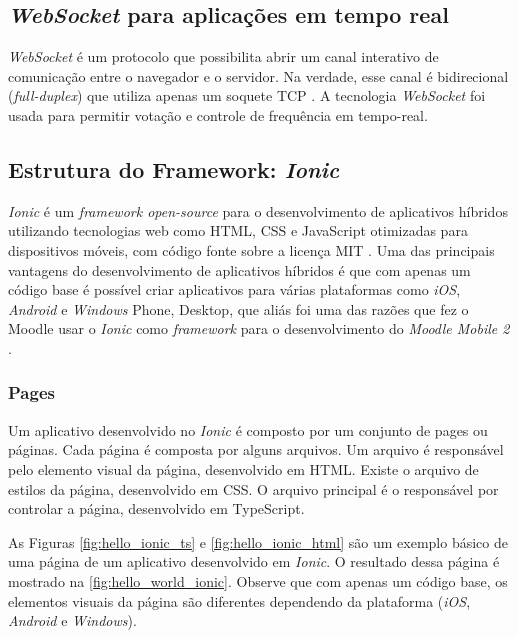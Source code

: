 \subsection{\textit{WebSocket} para aplicações em tempo real}

\textit{WebSocket} é um protocolo que possibilita abrir um canal interativo de comunicação
entre o navegador e o servidor. Na verdade, esse canal é bidirecional (\textit{full-duplex})
que utiliza apenas um soquete TCP \cite{websocket2016}.
A tecnologia \textit{WebSocket} foi usada para permitir votação e controle de frequência em tempo-real.

\subsection{Estrutura do Framework: \textit{Ionic}}

\textit{Ionic} é um \textit{framework open-source} para o desenvolvimento de aplicativos
híbridos utilizando tecnologias web como HTML,
CSS e JavaScript otimizadas
para dispositivos móveis, com código fonte sobre a licença MIT \cite{ionic2016}.
Uma das principais vantagens do desenvolvimento de aplicativos híbridos é que com
apenas um código base é possível criar aplicativos para várias plataformas como
\textit{iOS}, \textit{Android} e \textit{Windows} Phone, Desktop, que aliás foi uma das razões que fez o Moodle
usar o \textit{Ionic} como \textit{framework} para o desenvolvimento do \textit{Moodle Mobile 2} \cite{moodle2016}.

\subsubsection{Pages}

Um aplicativo desenvolvido no \textit{Ionic} é composto por um conjunto de pages ou páginas.
Cada página é composta por alguns arquivos. Um arquivo é responsável pelo
elemento visual da página, desenvolvido em HTML. Existe o arquivo de estilos da página,
desenvolvido em CSS. O arquivo principal é o responsável por controlar a página, desenvolvido
em TypeScript.

As Figuras \ref{fig:hello_ionic_ts} e \ref{fig:hello_ionic_html} são um exemplo básico de
uma página de um aplicativo desenvolvido em \textit{Ionic}. O resultado dessa página é mostrado
na \autoref{fig:hello_world_ionic}. Observe que com apenas um código base, os elementos
visuais da página são diferentes dependendo da plataforma (\textit{iOS}, \textit{Android} e \textit{Windows}).

